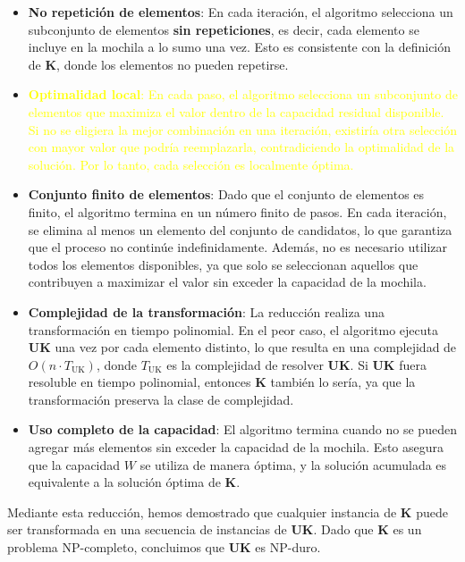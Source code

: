 \documentclass{report}
\begin{document}
\begin{itemize}
	\item \textbf{No repetición de elementos}: En cada iteración, el algoritmo selecciona un subconjunto de elementos \textbf{sin repeticiones}, es decir, cada elemento se incluye en la mochila a lo sumo una vez. Esto es consistente con la definición de \textbf{K}, donde los elementos no pueden repetirse.
	
	\item \textcolor{yellow}{\textbf{Optimalidad local}: En cada paso, el algoritmo selecciona un subconjunto de elementos que maximiza el valor dentro de la capacidad residual disponible. Si no se eligiera la mejor combinación en una iteración, existiría otra selección con mayor valor que podría reemplazarla, contradiciendo la optimalidad de la solución. Por lo tanto, cada selección es localmente óptima.}
	
	\item \textbf{Conjunto finito de elementos}: Dado que el conjunto de elementos es finito, el algoritmo termina en un número finito de pasos. En cada iteración, se elimina al menos un elemento del conjunto de candidatos, lo que garantiza que el proceso no continúe indefinidamente. Además, no es necesario utilizar todos los elementos disponibles, ya que solo se seleccionan aquellos que contribuyen a maximizar el valor sin exceder la capacidad de la mochila.
	
	\item \textbf{Complejidad de la transformación}: La reducción realiza una transformación en tiempo polinomial. En el peor caso, el algoritmo ejecuta \textbf{UK} una vez por cada elemento distinto, lo que resulta en una complejidad de \( O(n \cdot T_{\text{UK}}) \), donde \( T_{\text{UK}} \) es la complejidad de resolver \textbf{UK}. Si \textbf{UK} fuera resoluble en tiempo polinomial, entonces \textbf{K} también lo sería, ya que la transformación preserva la clase de complejidad.
	
	\item \textbf{Uso completo de la capacidad}: El algoritmo termina cuando no se pueden agregar más elementos sin exceder la capacidad de la mochila. Esto asegura que la capacidad \( W \) se utiliza de manera óptima, y la solución acumulada es equivalente a la solución óptima de \textbf{K}.
\end{itemize}
Mediante esta reducción, hemos demostrado que cualquier instancia de \textbf{K} puede ser transformada en una secuencia de instancias de \textbf{UK}. Dado que \textbf{K} es un problema NP-completo, concluimos que \textbf{UK} es NP-duro.
\end{document}
